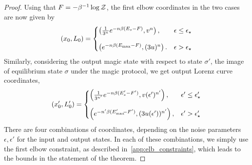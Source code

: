 \documentclass[pra,
aps,
twocolumn,
superscriptaddress,
groupedaddress,
nofootinbib,
reprint
]{revtex4-1}
\begin{document}
\begin{proof}
Using that $F = -\beta^{-1} \log \mathcal{Z}$, the first elbow coordinates in the two cases are now given by
\begin{equation}\label{eq:first_elb_coords}
	(x_0, L_0) =
	\begin{cases}
		\left(\frac{1}{3^n} e^{-n\beta (E_s - F)}, v^n \right), &\epsilon \leq \epsilon_\star \vspace{10pt}\\
		\left( e^{-n\beta (E_{\rm{max}}-F)}, (3u)^n \right). &\epsilon > \epsilon_\star
	\end{cases}
\end{equation}
Similarly, considering the output magic state with respect to state $\sigma'$, the image of equilibrium state $\sigma$ under the magic protocol, we get output Lorenz curve coordinates,
\begin{equation}\label{eq:transformed_first_elb_coords}
	(x'_0, L'_0) =
	\begin{cases}
		\left(\frac{1}{3^{n'}} e^{-n\beta (E'_s - F')}, v(\epsilon')^{n'} \right), &\epsilon' \leq \epsilon'_\star \vspace{10pt}\\
		\left( e^{-n'\beta (E'_{\rm{max}}\hspace{-2.5pt}-F')}, (3u(\epsilon'))^{n'} \right), &\epsilon' > \epsilon'_\star
	\end{cases}
\end{equation}
There are four combinations of coordinates, depending on the noise parameters $\epsilon, \epsilon'$ for the input and output states.
In each of these combinations, we simply use the first elbow constraint, as described in~\cref{app:elb_constraints}, which leads to the bounds in the statement of the theorem.

\end{proof}
\end{document}
